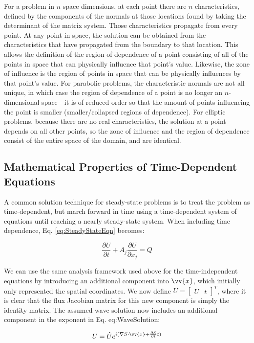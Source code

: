 \documentclass[10pt]{article}
\newcommand{\beq}{\begin{equation}}
\newcommand{\eeq}{\end{equation}}
\begin{document}
\begin{flushleft}
For a problem in \(n\) space dimensions, at each point there are \(n\) characteristics, defined by the components of the normals at those locations found by taking the determinant of the matrix system. Those characteristics propagate from every point. At any point in space, the solution can be obtained from the characteristics that have propagated from the boundary to that location. This allows the definition of the region of dependence of a point consisting of all of the points in space that can physically influence that point's value. Likewise, the zone of influence is the region of points in space that can be physically influences by that point's value. For parabolic problems, the characteristic normals are not all unique, in which case the region of dependence of a point is no longer an \(n\)-dimensional space - it is of reduced order so that the amount of points influencing the point is smaller (smaller/collapsed regions of dependence). For elliptic problems, because there are no real characteristics, the solution at a point depends on all other points, so the zone of influence and the region of dependence consist of the entire space of the domain, and are identical.

\subsection{Mathematical Properties of Time-Dependent Equations}

A common solution technique for steady-state problems is to treat the problem as time-dependent, but march forward in time using a time-dependent system of equations until reaching a nearly steady-state system. When including time dependence, Eq. \eqref{eq:SteadyStateEqn} becomes:

\beq
\label{eq:TransientEqn}
\frac{\partial U}{\partial t}+A_j\frac{\partial U}{\partial x_j}=Q
\eeq

We can use the same analysis framework used above for the time-independent equations by introducing an additional component into \(\vv{x}\), which initially only represented the spatial coordinates. We now define \(U=\begin{bmatrix}U & t\end{bmatrix}^T\), where it is clear that the flux Jacobian matrix for this new component is simply the identity matrix. The assumed wave solution now includes an additional component in the exponent in Eq. {eq:WaveSolution}:

\beq
U=\hat{U}e^{i(\nabla S\cdot\vv{x}+\frac{\partial S}{\partial t}t)}
\eeq


\end{flushleft}
\end{document}
